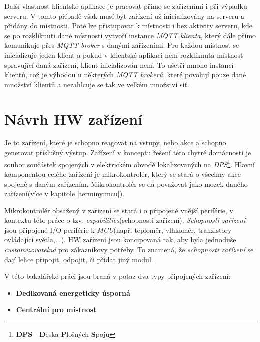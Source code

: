 Další vlastnost klientské aplikace je pracovat přímo se zařízeními i při výpadku serveru.
V tomto případě však musí být zařízení už inicializovány na serveru a přidány do místnosti.
Poté lze přistupovat k místnosti i bez aktivity serveru, kde se po rozkliknutí dané místnosti vytvoří instance \emph{MQTT klienta}, který dále přímo komunikuje přes \emph{MQTT broker} s danými zařízeními.
Pro každou místnost se inicializuje jeden klient a pokud v klientské aplikaci není rozkliknuta místnost spravující daná zařízení, klient inicializován není.
To ušetří mnoho instancí klientů, což je výhodou u některých \emph{MQTT brokerů}, které povolují pouze dané množství klientů a nezahlcuje se tak ve velkém množství síť.

\section{Návrh HW zařízení}
\label{navrh:hardware}

Je to zařízení, které je schopno reagovat na vstupy, nebo akce a schopno generovat příslušný výstup.
Zařízení v konceptu řešení této chytré domácnosti je soubor součástek spojených v elektrickém obvodě lokalizovaných na \emph{DPS}\footnote{\textbf{DPS} - \textbf{D}eska \textbf{P}lošných \textbf{S}pojů}.
Hlavní komponentou celého zařízení je mikrokontrolér, který se stará o všechny akce spojené s daným zařízením.
Mikrokontrolér se dá považovat jako mozek daného zařízení(více v kapitole \ref{terminy:mcu}).

Mikrokontrolér obsažený v zařízení se stará i o připojené vnější periférie, v kontextu této práce o tzv. \emph{capabilities}(schopnosti zařízení).
\emph{Schopnosti zařízení} jsou připojené I/O periférie k \emph{MCU}(např. teploměr, vlhkoměr, tranzistory ovládající světla,...).
HW zařízení jsou koncipovaná tak, aby byla jednoduše \emph{customizovatelná} pro zákazníkovy potřeby.
To znamená, že \emph{schopnosti zařízení} se dají lehce připojit, odpojit, či přidat jiný modul.
\newline

V této bakalářské práci jsou braná v potaz dva typy připojených zařízení:
\begin{itemize}
  \item \textbf{Dedikovaná energeticky úsporná}
  \item \textbf{Centrální pro místnost}
\end{itemize}

